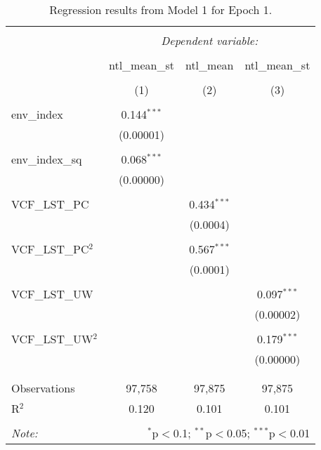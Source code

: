 
\begin{table}[hbt] \centering 
  \caption{Regression results from Model 1 for Epoch 1.} 
  \label{} 
\begin{tabular}{@{\extracolsep{5pt}}lccc} 
\\[-1.8ex]\hline 
\hline \\[-1.8ex] 
 & \multicolumn{3}{c}{\textit{Dependent variable:}} \\ 
\cline{2-4} 
\\[-1.8ex] & ntl\_mean\_st & ntl\_mean & ntl\_mean\_st \\ 
\\[-1.8ex] & (1) & (2) & (3)\\ 
\hline \\[-1.8ex] 
 env\_index & 0.144$^{***}$ &  &  \\ 
  & (0.00001) &  &  \\ 
  & & & \\ 
 env\_index\_sq & 0.068$^{***}$ &  &  \\ 
  & (0.00000) &  &  \\ 
  & & & \\ 
 VCF\_LST\_PC &  & 0.434$^{***}$ &  \\ 
  &  & (0.0004) &  \\ 
  & & & \\ 
 VCF\_LST\_PC$^2$ &  & 0.567$^{***}$ &  \\ 
  &  & (0.0001) &  \\ 
  & & & \\ 
 VCF\_LST\_UW &  &  & 0.097$^{***}$ \\ 
  &  &  & (0.00002) \\ 
  & & & \\ 
 VCF\_LST\_UW$^2$ &  &  & 0.179$^{***}$ \\ 
  &  &  & (0.00000) \\ 
  & & & \\ 
\hline \\[-1.8ex] 
Observations & 97,758 & 97,875 & 97,875 \\ 
R$^{2}$ & 0.120 & 0.101 & 0.101 \\ 
\hline 
\hline \\[-1.8ex] 
\textit{Note:}  & \multicolumn{3}{r}{$^{*}$p$<$0.1; $^{**}$p$<$0.05; $^{***}$p$<$0.01} \\ 
\end{tabular} 
\end{table} 
